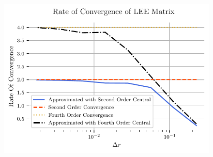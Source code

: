 \documentclass{article}
\begin{document}
\begin{figure}
    \centering
    \includegraphics[width=\textwidth]{tex-outputs/LEE_ROC.pdf}
\end{figure}
\end{document}
